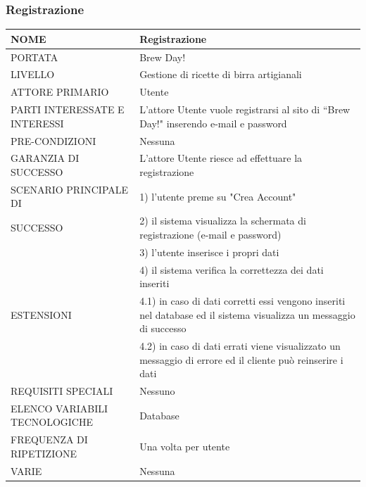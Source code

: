 \documentclass[a4paper, titlepage]{article}
\begin{document}
\subsubsection{Registrazione}
\begin{longtable}{p{6cm}p{7cm}}\toprule
    NOME & Registrazione\\\midrule
    PORTATA & Brew Day!\\\midrule
    LIVELLO & Gestione di ricette di birra artigianali\\\midrule
    ATTORE PRIMARIO & Utente\\\midrule
    PARTI INTERESSATE E INTERESSI & L’attore Utente vuole registrarsi al sito di “Brew Day!" inserendo e-mail e password\\\midrule
    PRE-CONDIZIONI & Nessuna\\\midrule
    GARANZIA DI SUCCESSO & L’attore Utente riesce ad effettuare la registrazione\\\midrule
    SCENARIO PRINCIPALE DI
    & 1) l’utente preme su "Crea Account"\\
    SUCCESSO & 2) il sistema visualizza la schermata di registrazione (e-mail e password)\\
    & 3) l’utente inserisce i propri dati\\
    & 4) il sistema   verifica la correttezza dei dati inseriti\\\midrule
    ESTENSIONI
    & 4.1) in caso di dati corretti essi vengono inseriti
    nel database ed il sistema visualizza un messaggio di successo\\
    & 4.2) in caso di dati errati viene visualizzato un messaggio di errore ed il cliente può reinserire i dati\\\midrule
    REQUISITI SPECIALI & Nessuno\\\midrule
    ELENCO VARIABILI TECNOLOGICHE & Database\\\midrule
    FREQUENZA DI RIPETIZIONE & Una volta per utente\\\midrule
    VARIE & Nessuna\\\bottomrule                                
\end{longtable}
\vphantom{}
\newpage
\end{document}
